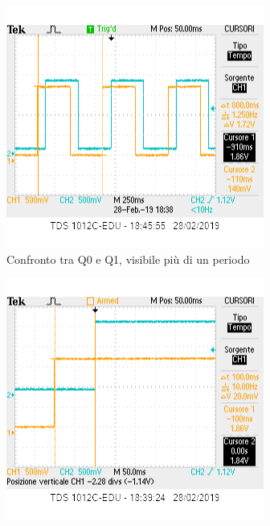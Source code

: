 \documentclass[10pt,a4paper]{article}
\begin{document}
\begin{figure}[h]
	\centering
	\begin{subfigure}[b]{0.4\linewidth}
		\includegraphics[width=\linewidth]{q0q1periodosr.png}
		\caption{Confronto tra Q0 e Q1, visibile più di un periodo}
	\end{subfigure}
	\begin{subfigure}[b]{0.4\linewidth}
		\includegraphics[width=\linewidth]{q0q1sr.png}

\end{subfigure}
\end{figure}
\end{document}
